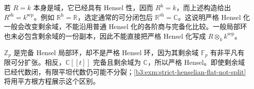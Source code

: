 若 \(R=k\) 本身是域，它已经具有 Hensel 性，因而 \(R^{\mathrm h}=k\)，而上述构造给出 \(R^{\mathrm{sh}}=k^{\mathrm{sep}}\)。例如 \(\mathbb R^{\mathrm h}=\mathbb R\)，选定通常的可分闭包后 \(\mathbb R^{\mathrm{sh}}=\mathbb C\)。这说明严格 Hensel 化一般会改变剩余域，不能沿用普通 Hensel 化的各阶商与完备化比较。一般局部环也未必包含剩余域的一份副本，因此不能直接把严格 Hensel 化写成 \(R\otimes_k k^{\mathrm{sep}}\)。

\ProseParagraphBreak
\(\mathbb Z_p\) 是完备 Hensel 局部环，却不是严格 Hensel 环，因为其剩余域 \(\mathbb F_p\) 有非平凡有限可分扩张。相反，\(\mathbb C[\![t]\!]\) 完备且剩余域为 \(\mathbb C\)，所以严格 Hensel。即使剩余域已经代数闭，有限平坦代数仍可能不分裂；\cref{b3:exm:strict-henselian-flat-not-split}将用平方根方程展示这个区别。
